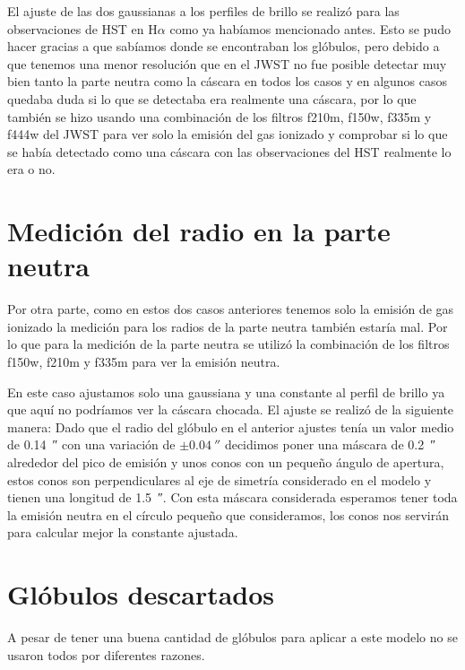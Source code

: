 \documentclass{book}
\begin{document}
El ajuste de las dos gaussianas a los perfiles de brillo se realizó para las observaciones de HST en H$\alpha$  como ya habíamos mencionado antes. Esto se pudo hacer gracias a que sabíamos donde se encontraban los glóbulos, pero debido a que tenemos una menor resolución que en el JWST no fue posible detectar muy bien tanto la parte neutra como la cáscara en todos los casos y en algunos casos quedaba duda si lo que se detectaba era realmente una cáscara, por lo que también se hizo usando una combinación de los filtros f210m, f150w, f335m y f444w del JWST para ver solo la emisión del gas ionizado y comprobar si lo que se había detectado como una cáscara con las observaciones del HST realmente lo era o no.

\section{Medición del radio en la parte neutra}

Por otra parte, como en estos dos casos anteriores tenemos solo la emisión de gas ionizado la medición para los radios de la parte neutra también estaría mal. Por lo que para la medición de la parte neutra se utilizó la combinación de los filtros f150w, f210m y f335m para ver la emisión neutra. 

En este caso ajustamos solo una gaussiana y una constante al perfil de brillo ya que aquí no podríamos ver la cáscara chocada. El ajuste se realizó de la siguiente manera: Dado que el radio del glóbulo en el anterior ajustes tenía un valor medio de \SI{0.14}{\arcsecond} con una variación de $\pm\SI{0.04}{\arcsecond}$ decidimos poner una máscara de \SI{0.2}{\arcsecond} alrededor del pico de emisión y unos conos con un pequeño ángulo de apertura, estos conos son perpendiculares al eje de simetría considerado en el modelo y tienen una longitud de \SI{1.5}{\arcsecond}. Con esta máscara considerada esperamos tener toda la emisión neutra en el círculo pequeño que consideramos, los conos nos servirán para calcular mejor la constante ajustada.  

\section{Glóbulos descartados}\label{Bad globules}

A pesar de tener una buena cantidad de glóbulos para aplicar a este modelo no se usaron todos por diferentes razones. 
\end{document}
